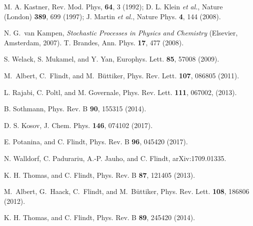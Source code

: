 \documentclass[aps,prb,twocolumn,footinbib,showpacs,superscriptaddress,preprintnumbers,amsmath,amssymb]{revtex4-1}
\begin{document}
\begin{thebibliography}{99}
 M. A. Kastner, Rev. Mod. Phys, {\bf 64}, 3 (1992); D. L. Klein {\it et al.}, Nature (London) {\bf 389}, 699 (1997); J. Martin {\it et al.}, Nature Phys. {\bf 4}, 144 (2008).


N. G.~van Kampen, \emph{Stochastic Processes in Physics and Chemistry} (Elsevier, Amsterdam, 2007).
T. Brandes, Ann. Phys. {\bf 17}, 477 (2008).

S. Welack, S. Mukamel, and Y. Yan, Europhys. Lett. {\bf 85}, 57008 (2009).

M.~Albert, C.~Flindt, and M.~B\"{u}ttiker, Phys. Rev. Lett. {\bf 107}, 086805 (2011).

L. Rajabi, C. Poltl, and M. Governale, Phys. Rev. Lett. {\bf 111}, 067002, (2013).

 B. Sothmann, Phys. Rev. B {\bf 90}, 155315 (2014).

D. S. Kosov, J. Chem. Phys. {\bf 146}, 074102 (2017).

E. Potanina, and C. Flindt, Phys. Rev. B {\bf 96}, 045420 (2017).

N. Walldorf, C. Padurariu, A.-P. Jauho, and C. Flindt, arXiv:1709.01335.

 K. H. Thomas, and C. Flindt, Phys. Rev. B {\bf 87}, 121405 (2013).


M.~Albert, G.~Haack, C.~Flindt, and M.~B\"{u}ttiker, Phys. Rev. Lett. {\bf 108}, 186806 (2012).

K. H. Thomas, and C. Flindt, Phys. Rev. B {\bf 89}, 245420 (2014).


\end{thebibliography}
\end{document}
